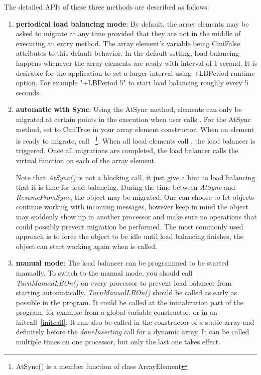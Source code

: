 The detailed APIs of these three methods are described as follows:
\begin{enumerate}

\item {\bf periodical load balancing mode}: By default, the array elements 
may be asked to migrate at any time provided that they are not in 
the middle of executing an entry method. 
The array element's variable  being CmiFalse attributes
to this default behavior. In the default setting, load balancing happens
whenever the array elements are ready with interval of 1 second. It is 
desirable for the application to set a larger interval using +LBPeriod
runtime option. For example "+LBPeriod 5" to start load balancing roughly
every 5 seconds.

\item {\bf automatic with Sync}: Using the AtSync method, elements can 
only be migrated at certain points in the execution when user calls 
. 
For the AtSync method, set  to CmiTrue in your 
array element constructor.  When an element is ready to migrate,
call ~\footnote{AtSync() is a member function of class ArrayElement}.  
When all local elements call , the load balancer is triggered.  
Once all migrations are completed, the load balancer calls the 
virtual function  on each of the
array element.  

Note that {\em AtSync()} is not a blocking call, it just give a hint to load
balancing that it is time for load balancing. During the time between 
{\em AtSync} and {\em ResumeFromSync}, the object may be migrated. 
One can choose to let objects continue working with incoming messages,
however keep in mind the object may suddenly show up in another processor
and make sure no operations that could possibly prevent migration 
be performed. The most commonly used approach is to force the object to 
be idle until load balancing finishes, the object can start working again
when  is called.

\item {\bf manual mode}: The load balancer can be programmed to be started
manually. To switch to the manual mode, you should call
{\em TurnManualLBOn()} on every processor to prevent load balancer from 
starting automatically. {\em TurnManualLBOn()} should be called as 
early as possible in the program. It could be called at the initialization 
part of the program, 
for example from a global variable constructor, or in an initcall~\ref{initcall}.
It can also be called in the constructor of a static array and
definitely before the {\em doneInserting} call for a dynamic array.  
It can be called multiple times on one 
processor, but only the last one takes effect.


\end{enumerate}
